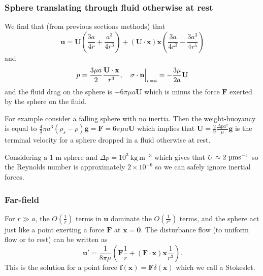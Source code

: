 \documentclass{article}
\begin{document}
\subsubsection{Sphere translating through fluid otherwise at rest}
We find that (from previous sections methods) that
\[
	\mathbf u = \mathbf U\left(\frac {3a}{4r} + \frac{a^3}{4r^3}\right) + (\mathbf U \cdot\mathbf x)\mathbf x\left(\frac{3a}{4r^3} - \frac{3a^3}{4r^5}\right)
\]
and
\[
	p = \frac {3\mu a}2 \frac{\mathbf U\cdot\mathbf x}{r^3},\quad \sigma\cdot\mathbf n \Big{|}_{r=a} = -\frac{3\mu}{2a} \mathbf U
\]
and the fluid drag on the sphere is $ -6\pi\mu a \mathbf U $ which is minus the force $ \mathbf F $ exerted by the sphere on the fluid. \par
For example consider a falling sphere with no inertia. Then the weight-buoyancy is equal to $ \frac 43 \pi a^3(\rho_s-\rho) \mathbf g = \mathbf F = 6\pi \mu a \mathbf U $ which implies that $ \mathbf U = \frac 29 \frac{\Delta p a^2}{\mu} \mathbf g $ is the terminal velocity for a sphere dropped in a fluid otherwise at rest.\par
\begin{example}
	Considering a $ 1 $ \textmu m sphere and $ \Delta p = 10^3 \ \text{kg} \ \mathrm{m}^{-3} $ which gives that $ U\approx 2\ \text{\textmu m}\text{s}^{-1} $ so the Reynolds number is approximately $ 2\times 10^{-6} $ so we can safely ignore inertial forces.
\end{example}
\subsubsection{Far-field}
For $ r\gg a $, the $ O\left(\frac 1r\right) $ terms in $ \mathbf u $ dominate the $ O\left(\frac 1{r^3}\right) $ terms, and the sphere act just like a point exerting a force $ \mathbf F $ at $ \mathbf x = \mathbf 0 $. The disturbance flow (to uniform flow or to rest) can be written as
\[
	\mathbf u' = \frac 1{8\pi \mu}\left(\mathbf F \frac 1r+ (\mathbf F\cdot\mathbf x)\mathbf x \frac 1{r^3}\right).
\]
This is the solution for a point force $ \mathbf f(\mathbf x) = \mathbf F \delta(\mathbf x) $ which we call a Stokeslet.
\end{document}
